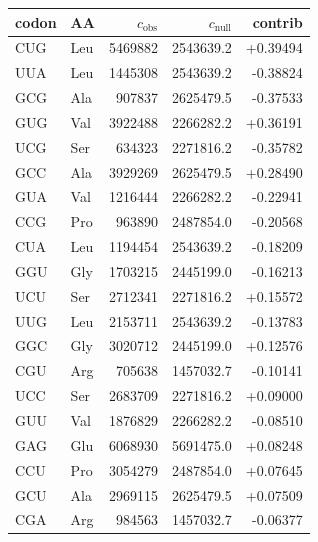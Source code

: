 \begin{center}
\scriptsize
\setlength{\tabcolsep}{4pt}
\renewcommand{\arraystretch}{1.10}
\begin{tabular}{llrrr}
\toprule
codon & AA & $c_{\mathrm{obs}}$ & $c_{\mathrm{null}}$ & contrib \\
\midrule
CUG & Leu & 5469882 & 2543639.2 & +0.39494 \\
UUA & Leu & 1445308 & 2543639.2 & -0.38824 \\
GCG & Ala & 907837 & 2625479.5 & -0.37533 \\
GUG & Val & 3922488 & 2266282.2 & +0.36191 \\
UCG & Ser & 634323 & 2271816.2 & -0.35782 \\
GCC & Ala & 3929269 & 2625479.5 & +0.28490 \\
GUA & Val & 1216444 & 2266282.2 & -0.22941 \\
CCG & Pro & 963890 & 2487854.0 & -0.20568 \\
CUA & Leu & 1194454 & 2543639.2 & -0.18209 \\
GGU & Gly & 1703215 & 2445199.0 & -0.16213 \\
UCU & Ser & 2712341 & 2271816.2 & +0.15572 \\
UUG & Leu & 2153711 & 2543639.2 & -0.13783 \\
GGC & Gly & 3020712 & 2445199.0 & +0.12576 \\
CGU & Arg & 705638 & 1457032.7 & -0.10141 \\
UCC & Ser & 2683709 & 2271816.2 & +0.09000 \\
GUU & Val & 1876829 & 2266282.2 & -0.08510 \\
GAG & Glu & 6068930 & 5691475.0 & +0.08248 \\
CCU & Pro & 3054279 & 2487854.0 & +0.07645 \\
GCU & Ala & 2969115 & 2625479.5 & +0.07509 \\
CGA & Arg & 984563 & 1457032.7 & -0.06377 \\
\bottomrule
\end{tabular}
\end{center}
